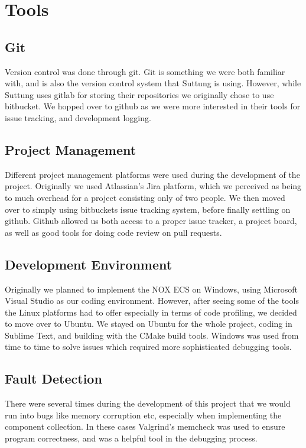 \section{Tools}
\subsection{Git}
Version control was done through git. Git is something we were both familiar with, and is also the version control
system that Suttung is using. However, while Suttung uses gitlab for storing their repositories we originally
chose to use bitbucket. We hopped over to github as we were more interested in their tools for issue tracking,
and development logging.

\subsection{Project Management}
Different project management platforms were used during the development of the project.
Originally we used Atlassian's Jira platform, which we perceived as being to much overhead for a project
consisting only of two people. We then moved over to simply using bitbuckets issue tracking system, before finally
settling on github. Github allowed us both access to a proper issue tracker, a project board, as well as good tools
for doing code review on pull requests.

\subsection{Development Environment}
Originally we planned to implement the NOX ECS on Windows, using Microsoft Visual Studio as our coding environment.
However, after seeing some of the tools the Linux platforms had to offer especially in terms of code profiling,
we decided to move over to Ubuntu.
We stayed on Ubuntu for the whole project, coding in Sublime Text, and building with the CMake build tools.
Windows was used from time to time to solve issues which required more sophisticated debugging tools.

\subsection{Fault Detection}
There were several times during the development of this project that we would run into bugs like memory corruption etc,
especially when implementing the component collection.
In these cases Valgrind's memcheck was used to ensure program correctness, and was a helpful tool in the debugging process.
